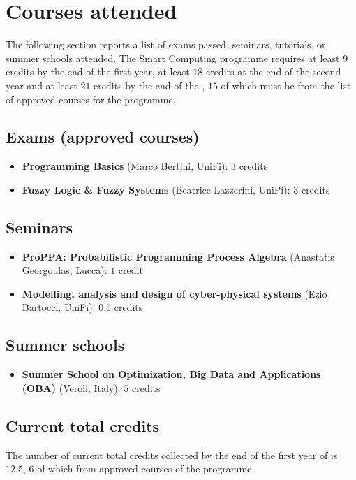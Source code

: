 
\section*{Courses attended}
  The following section reports a list of exams passed, seminars, tutorials, or summer schools attended. The Smart Computing  programme requires at least $9$ credits by the end of the first year, at least $18$ credits at the end of the second year and at least $21$ credits by the end of the , $15$ of which must be from the list of approved courses for the  programme.

  \subsection*{Exams (approved courses)}
  
    \begin{itemize}
      \item \textbf{ Programming Basics} (Marco Bertini, \ac{UniFi}): $3$ credits
      \item \textbf{Fuzzy Logic \& Fuzzy Systems} (Beatrice Lazzerini, \ac{UniPi}): $3$ credits
    \end{itemize}
    
  \subsection*{Seminars}
  
    \begin{itemize}
      \item \textbf{\ac{ProPPA}: Probabilistic Programming Process Algebra} (Anastatis Georgoulas,  Lucca): $1$ credit
      \item \textbf{Modelling, analysis and design of cyber-physical systems} (Ezio Bartocci, \ac{UniFi}): $0.5$ credits
    \end{itemize}
    
  \subsection*{Summer schools}
  
    \begin{itemize}
      \item \textbf{Summer School on Optimization, Big Data and Applications (\ac{OBA})} (Veroli, Italy): $5$ credits
    \end{itemize}
    
  \subsection*{Current total credits}
  
    The number of current total credits collected by the end of the first year of  is $12.5$, $6$ of which from approved courses of the  programme.
    
\newpage
  